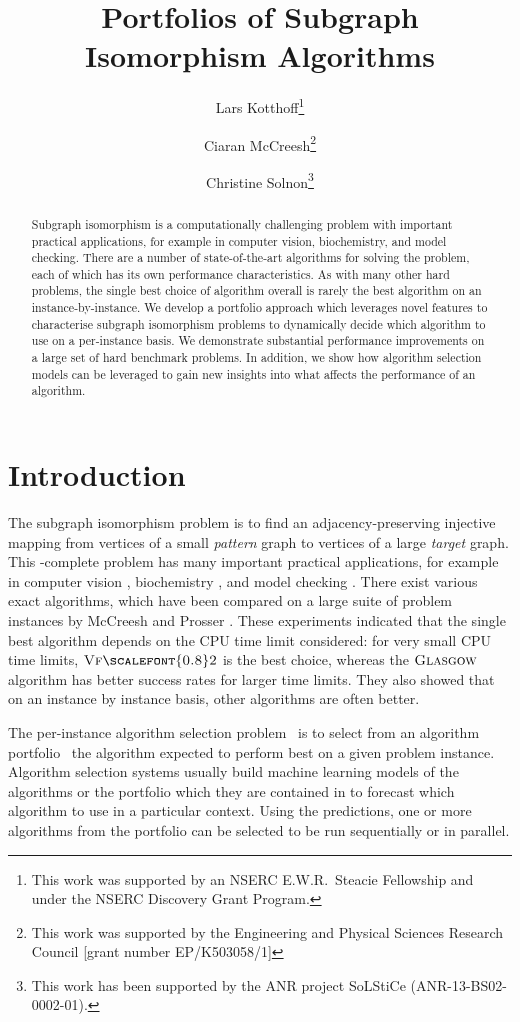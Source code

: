 \documentclass{llncs}
\title{Portfolios of Subgraph Isomorphism Algorithms}
\author{
    Lars Kotthoff\thanks{This work was supported by an NSERC E.W.R.\ Steacie
    Fellowship and under the NSERC Discovery Grant Program.}\inst{1}
    \and Ciaran McCreesh\thanks{This work was supported by the Engineering
        and Physical Sciences Research Council [grant number EP/K503058/1]}\inst{2}
    \and Christine Solnon\thanks{This work has been supported by the ANR project SoLStiCe (ANR-13-BS02-0002-01).}\inst{3}}
\institute{
    University of British Columbia, Vancouver, Canada
    \and University of Glasgow, Glasgow, Scotland
    \and INSA-Lyon, LIRIS, UMR5205, F-69621, France}
\newcommand{\VFtwo}{$\textsc{Vf{\scalefont{0.8}2}}$\xspace}
\newcommand{\Glasgow}{$\textsc{Glasgow}$\xspace}
\begin{document}
\maketitle

\begin{abstract}
Subgraph isomorphism is a computationally challenging problem with important practical
applications, for example in computer vision, biochemistry, and model checking. There are a number
of state-of-the-art algorithms for solving the problem, each of which has its own performance
characteristics. As with many other hard problems, the single best choice of algorithm overall is
rarely the best algorithm on an instance-by-instance. We develop a portfolio approach which leverages
novel features to characterise subgraph isomorphism problems to dynamically decide which algorithm
to use on a per-instance basis. We demonstrate substantial performance improvements on a large set
of hard benchmark problems. In addition, we show how algorithm selection models can be leveraged to
gain new insights into what affects the performance of an algorithm.
\end{abstract}

\section{Introduction}

The subgraph isomorphism problem is to find an adjacency-preserving injective mapping from vertices
of a small \emph{pattern} graph to vertices of a large \emph{target} graph. This \NP-complete
problem has many important practical applications, for example in computer vision
\cite{cviu11,pr15}, biochemistry \cite{Giugno:2013}, and model checking \cite{Sevegnani:2015}. There
exist various exact algorithms, which have been compared on a large suite of problem instances by
McCreesh and Prosser \cite{McCreesh:2015}. These experiments indicated that the single best
algorithm depends on the CPU time limit considered: for very small CPU time limits, \VFtwo
\cite{Cordella:2004} is the best choice, whereas the \Glasgow algorithm \cite{McCreesh:2015} has
better success rates for larger time limits.  They also showed that on an instance by instance
basis, other algorithms are often better.


The per-instance algorithm selection problem~\cite{rice_algorithm_1976} is to select from an
algorithm portfolio~\cite{huberman_economics_1997,gomes_algorithm_2001} the
algorithm expected to perform
best on a given problem instance. Algorithm selection systems usually build machine learning models
of the algorithms or the portfolio which they are contained in to forecast which algorithm to use in a
particular context. Using the predictions, one or more algorithms from the
portfolio can be selected to be run sequentially or in parallel.
\end{document}
